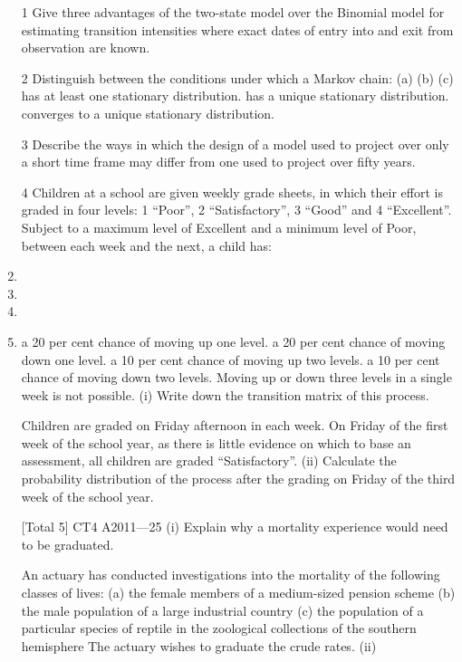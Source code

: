 \documentclass[a4paper,12pt]{article}
\begin{document}
\begin{enumerate}

1 Give three advantages of the two-state model over the Binomial model for estimating transition intensities where exact dates of entry into and exit from observation are
known.

2 Distinguish between the conditions under which a Markov chain:
(a)
(b)
(c)
has at least one stationary distribution.
has a unique stationary distribution.
converges to a unique stationary distribution.

3 Describe the ways in which the design of a model used to project over only a short time frame may differ from one used to project over fifty years.

4 Children at a school are given weekly grade sheets, in which their effort is graded in four levels: 1 “Poor”, 2 “Satisfactory”, 3 “Good” and 4 “Excellent”. Subject to a
maximum level of Excellent and a minimum level of Poor, between each week and the next, a child has:
\item
\item
\item
\item
a 20 per cent chance of moving up one level.
a 20 per cent chance of moving down one level.
a 10 per cent chance of moving up two levels.
a 10 per cent chance of moving down two levels.
Moving up or down three levels in a single week is not possible.
(i)
Write down the transition matrix of this process.

Children are graded on Friday afternoon in each week. On Friday of the first week of the school year, as there is little evidence on which to base an assessment, all children
are graded “Satisfactory”.
(ii)
Calculate the probability distribution of the process after the grading on Friday of the third week of the school year.

[Total 5]
CT4 A2011—25
(i)
Explain why a mortality experience would need to be graduated.

An actuary has conducted investigations into the mortality of the following classes of
lives:
(a) the female members of a medium-sized pension scheme
(b) the male population of a large industrial country
(c) the population of a particular species of reptile in the zoological
collections of the southern hemisphere
The actuary wishes to graduate the crude rates.
(ii)




\end{enumerate}
\end{document}
